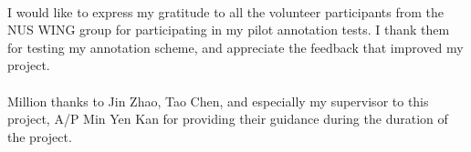 \documentclass[hyp]{socreport}
\begin{document}
\begin{acknowledgement}
\paragraph{}
I would like to express my gratitude to all the volunteer participants from the NUS WING group for participating in my pilot annotation tests. I thank them for testing my annotation scheme, and appreciate the feedback that improved my project.

\paragraph{}
Million thanks to Jin Zhao, Tao Chen, and especially my supervisor to this project, A/P Min Yen Kan for providing their guidance during the duration of the project.
\end{acknowledgement}

\listoffigures
\listoftables
\tableofcontents







 



\appendix

\end{document}

